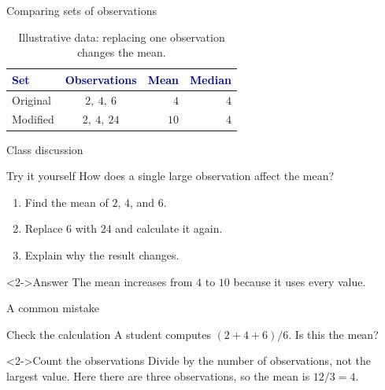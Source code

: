 \documentclass{luma}
\begin{document}
\begin{frame}{Comparing sets of observations}
  \begin{table}
    \centering
    \renewcommand{\arraystretch}{1.25}
    \setlength{\tabcolsep}{12pt}
    \begin{tabular}{@{}lcrr@{}}
      \toprule
      \textcolor{Navy}{\textbf{Set}} &
      \textcolor{Navy}{\textbf{Observations}} &
      \textcolor{Navy}{\textbf{Mean}} &
      \textcolor{Navy}{\textbf{Median}} \\
      \midrule
      Original & $2,\ 4,\ 6$  & $4$  & $4$ \\
      Modified & $2,\ 4,\ 24$ & $10$ & $4$ \\
      \bottomrule
    \end{tabular}
    \caption{Illustrative data: replacing one observation changes the mean.}
  \end{table}
  \medskip
\end{frame}

\begin{frame}{Class discussion}
  \begin{exerciseblock}{Try it yourself}
  How does a single large observation affect the mean?
  \medskip
  \begin{enumerate}
    \item Find the mean of $2$, $4$, and $6$.
    \item Replace $6$ with $24$ and calculate it again.
    \item Explain why the result changes.
  \end{enumerate}
  \end{exerciseblock}
  \begin{exampleblock}<2->{Answer}
    The mean increases from $4$ to $10$ because it uses every value.
  \end{exampleblock}
\end{frame}

\begin{frame}{A common mistake}
  \begin{exerciseblock}{Check the calculation}
    A student computes $(2+4+6)/6$. Is this the mean?
  \end{exerciseblock}
  \begin{cautionblock}<2->{Count the observations}
    Divide by the number of observations, not the largest value.
    Here there are three observations, so the mean is $12/3=4$.
  \end{cautionblock}
\end{frame}
\end{document}
